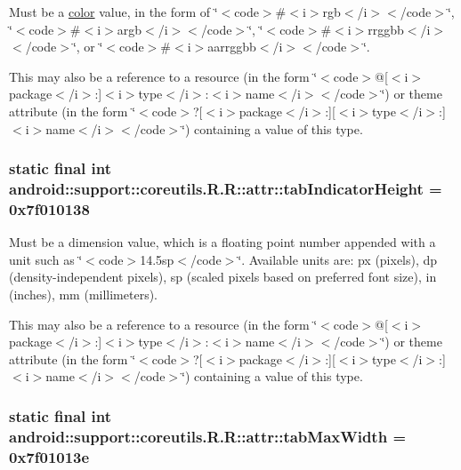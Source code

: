 Must be a \hyperlink{classandroid_1_1support_1_1coreutils_1_1_r_1_1color}{color} value, in the form of \char`\"{}$<$code$>$\#$<$i$>$rgb$<$/i$>$$<$/code$>$\char`\"{}, \char`\"{}$<$code$>$\#$<$i$>$argb$<$/i$>$$<$/code$>$\char`\"{}, \char`\"{}$<$code$>$\#$<$i$>$rrggbb$<$/i$>$$<$/code$>$\char`\"{}, or \char`\"{}$<$code$>$\#$<$i$>$aarrggbb$<$/i$>$$<$/code$>$\char`\"{}. 

This may also be a reference to a resource (in the form \char`\"{}$<$code$>$@\mbox{[}$<$i$>$package$<$/i$>$:\mbox{]}$<$i$>$type$<$/i$>$:$<$i$>$name$<$/i$>$$<$/code$>$\char`\"{}) or theme attribute (in the form \char`\"{}$<$code$>$?\mbox{[}$<$i$>$package$<$/i$>$:\mbox{]}\mbox{[}$<$i$>$type$<$/i$>$:\mbox{]}$<$i$>$name$<$/i$>$$<$/code$>$\char`\"{}) containing a value of this type. \hypertarget{classandroid_1_1support_1_1coreutils_1_1_r_1_1attr_16dbe4f5f9bd9bd387e2588f359b7c28}{
\subsubsection[{tabIndicatorHeight}]{\setlength{\rightskip}{0pt plus 5cm}static final int android::support::coreutils.R.R::attr::tabIndicatorHeight = 0x7f010138}}
\label{classandroid_1_1support_1_1coreutils_1_1_r_1_1attr_16dbe4f5f9bd9bd387e2588f359b7c28}


Must be a dimension value, which is a floating point number appended with a unit such as \char`\"{}$<$code$>$14.5sp$<$/code$>$\char`\"{}. Available units are: px (pixels), dp (density-independent pixels), sp (scaled pixels based on preferred font size), in (inches), mm (millimeters). 

This may also be a reference to a resource (in the form \char`\"{}$<$code$>$@\mbox{[}$<$i$>$package$<$/i$>$:\mbox{]}$<$i$>$type$<$/i$>$:$<$i$>$name$<$/i$>$$<$/code$>$\char`\"{}) or theme attribute (in the form \char`\"{}$<$code$>$?\mbox{[}$<$i$>$package$<$/i$>$:\mbox{]}\mbox{[}$<$i$>$type$<$/i$>$:\mbox{]}$<$i$>$name$<$/i$>$$<$/code$>$\char`\"{}) containing a value of this type. \hypertarget{classandroid_1_1support_1_1coreutils_1_1_r_1_1attr_ad5e2eb4d9bb41c77d17f5b04939f7a7}{
\subsubsection[{tabMaxWidth}]{\setlength{\rightskip}{0pt plus 5cm}static final int android::support::coreutils.R.R::attr::tabMaxWidth = 0x7f01013e}}
\label{classandroid_1_1support_1_1coreutils_1_1_r_1_1attr_ad5e2eb4d9bb41c77d17f5b04939f7a7}


